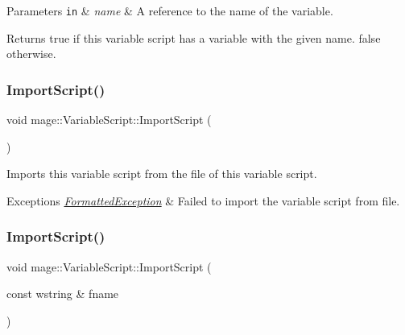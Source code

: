 \begin{DoxyParams}[1]{Parameters}
\mbox{\tt in}  & {\em name} & A reference to the name of the variable. \\
\hline
\end{DoxyParams}
\begin{DoxyReturn}{Returns}
{\ttfamily true} if this variable script has a variable with the given name. {\ttfamily false} otherwise. 
\end{DoxyReturn}
\hypertarget{classmage_1_1_variable_script_a5f1cc3bfb611edbc8dfb433ec55cc965}{}\label{classmage_1_1_variable_script_a5f1cc3bfb611edbc8dfb433ec55cc965} 
\subsubsection{\texorpdfstring{Import\+Script()}{ImportScript()}\hspace{0.1cm}{\footnotesize\ttfamily [1/2]}}
{\footnotesize\ttfamily void mage\+::\+Variable\+Script\+::\+Import\+Script (\begin{DoxyParamCaption}{ }\end{DoxyParamCaption})}

Imports this variable script from the file of this variable script.


\begin{DoxyExceptions}{Exceptions}
{\em \hyperlink{classmage_1_1_formatted_exception}{Formatted\+Exception}} & Failed to import the variable script from file. \\
\hline
\end{DoxyExceptions}
\hypertarget{classmage_1_1_variable_script_ae8bbfb30b5d47b5c66cd1b45bdd2cec5}{}\label{classmage_1_1_variable_script_ae8bbfb30b5d47b5c66cd1b45bdd2cec5} 
\subsubsection{\texorpdfstring{Import\+Script()}{ImportScript()}\hspace{0.1cm}{\footnotesize\ttfamily [2/2]}}
{\footnotesize\ttfamily void mage\+::\+Variable\+Script\+::\+Import\+Script (\begin{DoxyParamCaption}\item[{const wstring \&}]{fname }\end{DoxyParamCaption})}

